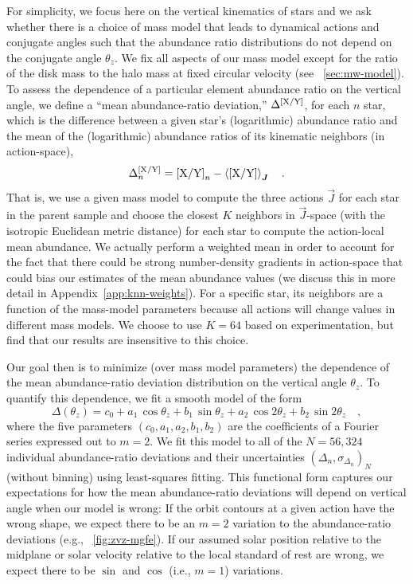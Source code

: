 \documentclass[modern]{aastex63}
\newcommand{\nstars}{56,324}
\begin{document}
For simplicity, we focus here on the vertical kinematics of stars and we ask
whether there is a choice of mass model that leads to dynamical actions and
conjugate angles such that the abundance ratio distributions do not depend on
the conjugate angle $\theta_z$.
We fix all aspects of our mass model except for the ratio of the disk mass to
the halo mass at fixed circular velocity (see \sectionname~\ref{sec:mw-model}).
To assess the dependence of a particular element abundance ratio
 on the vertical angle, we define a ``mean abundance-ratio
deviation,'' $\Delta^{{[\mathrm{X}/\mathrm{Y}]}}$, for each $n$ star, which is the
difference between a given star's (logarithmic) abundance ratio and the mean of
the (logarithmic) abundance ratios of its kinematic neighbors (in action-space),
\begin{equation}
  \Delta^{\abunratio{X}{Y}}_n = \abunratio{X}{Y}_n -
    \mean{\abunratio{X}{Y}}_{\vec{J}}
    \quad .
\end{equation}
That is, we use a given mass model to compute the three actions $\vec{J}$ for
each star in the parent sample and choose the closest $K$ neighbors in
$\vec{J}$-space (with the isotropic Euclidean metric distance) for each star to
compute the action-local mean abundance.
We actually perform a weighted mean in order to account for the fact that there
could be strong number-density gradients in action-space that could bias our
estimates of the mean abundance values (we discuss this in more detail in
Appendix~\ref{app:knn-weights}).
For a specific star, its neighbors are a function of the mass-model parameters
because all actions will change values in different mass models.
We choose to use $K=64$ based on experimentation, but find that our results are
insensitive to this choice.

Our goal then is to minimize (over mass model parameters) the dependence of the
mean abundance-ratio deviation distribution on the vertical angle $\theta_z$.
To quantify this dependence, we fit a smooth model of the form
\begin{equation}
  \Delta(\theta_z) = c_0 + a_1\,\cos  \theta_z + b_1\,\sin    \theta_z
                         + a_2\,\cos 2\theta_z + b_2\,\sin 2\theta_z \quad,
                         \label{eq:fouriermodel}
\end{equation}
where the five parameters $(c_0, a_1, a_2, b_1, b_2)$ are the coefficients of a
Fourier series expressed out to $m=2$.
We fit this model to all of the $N=\nstars$ individual abundance-ratio
deviations and their uncertainties $(\Delta_n, \sigma_{\Delta_n})_N$ (without
binning) using least-squares fitting.
This functional form captures our expectations for how the mean abundance-ratio
deviations will depend on vertical angle when our model is wrong:
If the orbit contours at a given action have the wrong shape, we expect there to
be an $m=2$ variation to the abundance-ratio deviations (e.g.,
\figurename~\ref{fig:zvz-mgfe}).
If our assumed solar position relative to the midplane or solar velocity
relative to the local standard of rest are wrong, we expect there to be $\sin$
and $\cos$ (i.e., $m=1$) variations.
\end{document}
